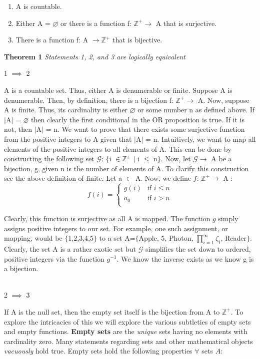 \documentclass{article}
\begin{document}
\begin{enumerate}
\item A is countable.
\item Either A = $\varnothing$ or there is a function f: $\mathbb{Z}^{+} \to$ A that is surjective.
\item There is a function f: A $\to \mathbb{Z}^{+}$ that is bijective.
\end{enumerate}
\textbf{Theorem 1}
\textit{Statements 1, 2, and 3 are logically equivalent}
\begin{flushleft}
1 $\implies$ 2
\end{flushleft}
\par A is a countable set. Thus, either A is denumerable or finite. Suppose A is denumerable. Then, by definition, there is a bijection f: $\mathbb{Z}^{+} \to$ A. Now, suppose A is finite. Thus, its cardinality is either $\varnothing$ or some number n as defined above. If $|$A$|$ = $\varnothing$ then clearly the first conditional in the OR proposition is true. If it is not, then $|$A$|$ = n. We want to prove that there exists some surjective function from the positive integers to A given that $|$A$|$ = n. Intuitively, we want to map all elements of the positive integers to all elements of A. This can be done by constructing the following set $\mathcal{G}$: $\{$i $\in \mathbb{Z}^{+}$ $|$ i $\leq$ n$\}$. Now, let $\mathcal{G} \to$ A be a bijection, g, given n is the number of elements of A. To clarify this construction see the above definition of finite. Let a $\in$ A. Now, we define $f$: $\mathbb{Z}^{+} \to$ A :
\[ f(i) =
	\begin{cases} 
      g(i) & \text{if } i \leq n \\
      a_{0} & \text{if } i > n \\
   \end{cases}
\]
\par Clearly, this function is surjective as all A is mapped. The function $g$ simply assigns positive integers to our set. For example, one such assignment, or mapping, would be $\{$1,2,3,4,5$\}$ to a set A=$\{$Apple, 5, Photon, $\prod_{i=1}^{\infty} \zeta_{i}$, Reader$\}$. Clearly, the set A is a rather exotic set but $\mathcal{G}$ simplifies the set down to ordered, positive integers via the function $g^{-1}$. We know the inverse exists as we know g is a bijection.
\\
\\
\begin{flushleft}
2 $\implies$ 3
\end{flushleft}
\par If A is the null set, then the empty set itself is the bijection from A to $\mathbb{Z}^{+}$. To explore the intricacies of this we will explore the various subtleties of empty sets and empty functions. \textbf{Empty sets} are the \textit{unique} sets having no elements with cardinality zero. Many statements regarding sets and other mathematical objects \textit{vacuously} hold true. Empty sets hold the following properties $\forall$ sets $A$:
\end{document}
